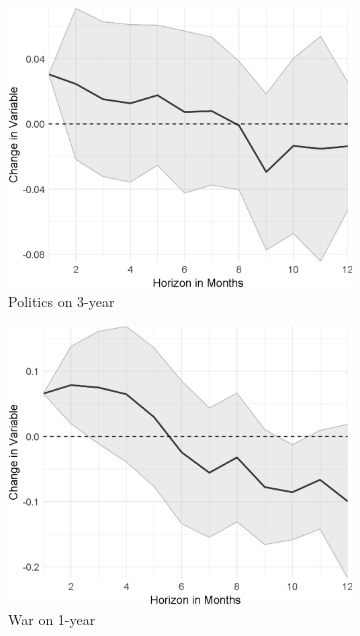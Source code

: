 \begin{figure}[H]
	\begin{subfigure}{00.32\textwidth}
		\includegraphics[width=1\textwidth]{output/lp/baseline/bHP/politics/politicsonexpectations3y_djn.eps}
		\caption{Politics on 3-year}
	\end{subfigure}
	\begin{subfigure}{00.32\textwidth}
		\includegraphics[width=1\textwidth]{output/lp/baseline/bHP/war/waronexpectations1y_djn.eps}
		\caption{War on 1-year}
	\end{subfigure}
	\begin{subfigure}{00.32\textwidth}

\end{subfigure}
\end{figure}
